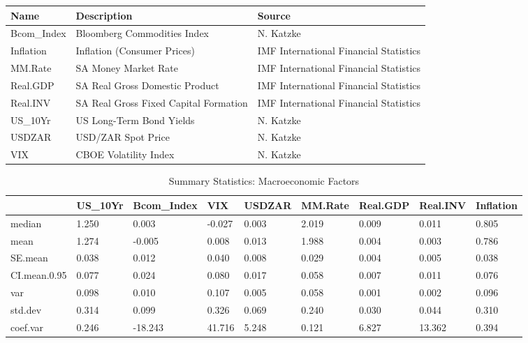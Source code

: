 \documentclass[11pt,preprint, authoryear]{elsarticle}
\let\origtable\table
\let\endorigtable\endtable
\renewenvironment{table}[1][2] {
    \expandafter\origtable\expandafter[H]
} {
    \endorigtable
}
\numberwithin{equation}{section}
\numberwithin{figure}{section}
\numberwithin{table}{section}
\begin{document}
\begin{table}[H]

\caption{\label{tab:Factors Description}Macroeconomic Factors}
\centering
\begin{tabular}[t]{l|l|l}
\hline
Name & Description & Source\\
\hline
Bcom\_Index & Bloomberg Commodities Index & N. Katzke\\
\hline
Inflation & Inflation (Consumer Prices) & IMF International Financial Statistics\\
\hline
MM.Rate & SA Money Market Rate & IMF International Financial Statistics\\
\hline
Real.GDP & SA Real Gross Domestic Product & IMF International Financial Statistics\\
\hline
Real.INV & SA Real Gross Fixed Capital Formation & IMF International Financial Statistics\\
\hline
US\_10Yr & US Long-Term Bond Yields & N. Katzke\\
\hline
USDZAR & USD/ZAR Spot Price & N. Katzke\\
\hline
VIX & CBOE Volatility Index & N. Katzke\\
\hline
\end{tabular}
\end{table}

\begin{longtable}[t]{l|l|l|l|l|l|l|l|l}
\caption{\label{tab:Descriptive Stats}Summary Statistics: Macroeconomic Factors}\\
\hline
  & US\_10Yr & Bcom\_Index & VIX & USDZAR & MM.Rate & Real.GDP & Real.INV & Inflation\\
\hline
median & 1.250 & 0.003 & -0.027 & 0.003 & 2.019 & 0.009 & 0.011 & 0.805\\
\hline
mean & 1.274 & -0.005 & 0.008 & 0.013 & 1.988 & 0.004 & 0.003 & 0.786\\
\hline
SE.mean & 0.038 & 0.012 & 0.040 & 0.008 & 0.029 & 0.004 & 0.005 & 0.038\\
\hline
CI.mean.0.95 & 0.077 & 0.024 & 0.080 & 0.017 & 0.058 & 0.007 & 0.011 & 0.076\\
\hline
var & 0.098 & 0.010 & 0.107 & 0.005 & 0.058 & 0.001 & 0.002 & 0.096\\
\hline
std.dev & 0.314 & 0.099 & 0.326 & 0.069 & 0.240 & 0.030 & 0.044 & 0.310\\
\hline
coef.var & 0.246 & -18.243 & 41.716 & 5.248 & 0.121 & 6.827 & 13.362 & 0.394\\
\hline
\end{longtable}
\end{document}
